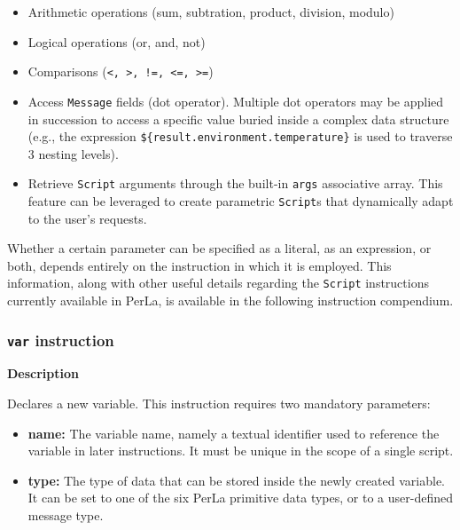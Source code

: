 \begin{itemize}
        
    \item Arithmetic operations (sum, subtration, product, division, modulo)

    \item Logical operations (or, and, not)

    \item Comparisons (\lstinline$<, >, !=, <=, >=$)

    \item Access \texttt{Message} fields (dot operator). Multiple dot operators
        may be applied in succession to access a specific value buried inside a
        complex data structure (e.g., the expression
        \lstinline!${result.environment.temperature}! is used to traverse 3
        nesting levels).

    \item Retrieve \texttt{Script} arguments through the built-in \texttt{args}
        associative array. This feature can be leveraged to create parametric
        \texttt{Script}s that dynamically adapt to the user's requests.

\end{itemize}

Whether a certain parameter can be specified as a literal, as an expression, or
both, depends entirely on the instruction in which it is employed. This
information, along with other useful details regarding the \texttt{Script}
instructions currently available in PerLa, is available in the following
instruction compendium.

\subsubsection{\texttt{var} instruction}

\textbf{Description}

Declares a new variable. This instruction requires two mandatory parameters:

\begin{itemize}

    \item \textbf{name:} The variable name, namely a textual identifier used to
        reference the variable in later instructions. It must be unique in the
        scope of a single script.

    \item \textbf{type:} The type of data that can be stored inside the newly
        created variable. It can be set to one of the six PerLa primitive data
        types, or to a user-defined  message type.

\end{itemize}

